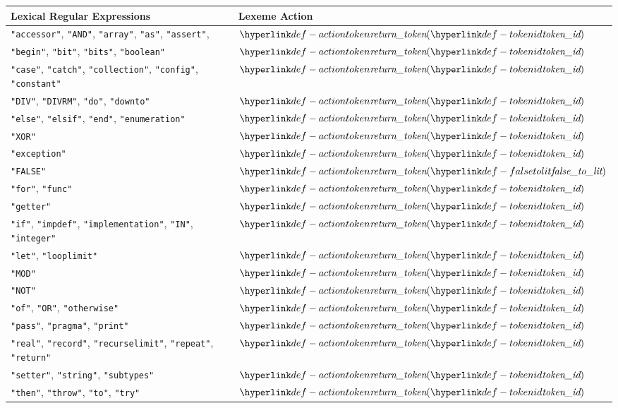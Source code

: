 \begin{center}
\begin{tabular}{ll}
\textbf{Lexical Regular Expressions} & \textbf{Lexeme Action}\\
\hline
\texttt{"accessor"}, \texttt{"AND"}, \texttt{"array"}, \texttt{"as"}, \texttt{"assert"},      & $\actiontoken(\tokenid)$ \\
\texttt{"begin"}, \texttt{"bit"}, \texttt{"bits"}, \texttt{"boolean"}       & $\actiontoken(\tokenid)$ \\
\texttt{"case"}, \texttt{"catch"}, \texttt{"collection"}, \texttt{"config"}, \texttt{"constant"}      & $\actiontoken(\tokenid)$ \\
\texttt{"DIV"}, \texttt{"DIVRM"}, \texttt{"do"}, \texttt{"downto"}        & $\actiontoken(\tokenid)$ \\
\texttt{"else"}, \texttt{"elsif"}, \texttt{"end"}, \texttt{"enumeration"}   & $\actiontoken(\tokenid)$ \\
\texttt{"XOR"}           & $\actiontoken(\tokenid)$ \\
\texttt{"exception"}     & $\actiontoken(\tokenid)$ \\
\texttt{"FALSE"} & $\actiontoken(\falsetolit)$  \\
\texttt{"for"}, \texttt{"func"}          & $\actiontoken(\tokenid)$ \\
\texttt{"getter"}        & $\actiontoken(\tokenid)$ \\
\texttt{"if"}, \texttt{"impdef"}, \texttt{"implementation"}, \texttt{"IN"}, \texttt{"integer"}       & $\actiontoken(\tokenid)$ \\
\texttt{"let"}, \texttt{"looplimit"}           & $\actiontoken(\tokenid)$ \\
\texttt{"MOD"}           & $\actiontoken(\tokenid)$ \\
\texttt{"NOT"}           & $\actiontoken(\tokenid)$ \\
\texttt{"of"},      \texttt{"OR"},      \texttt{"otherwise"}                  & $\actiontoken(\tokenid)$ \\
\texttt{"pass"},    \texttt{"pragma"},  \texttt{"print"}                      & $\actiontoken(\tokenid)$ \\
\texttt{"real"},    \texttt{"record"},  \texttt{"recurselimit"}, \texttt{"repeat"}, \texttt{"return"}  & $\actiontoken(\tokenid)$ \\
\texttt{"setter"},  \texttt{"string"},  \texttt{"subtypes"}                   & $\actiontoken(\tokenid)$ \\
\texttt{"then"},    \texttt{"throw"},   \texttt{"to"}, \texttt{"try"}         & $\actiontoken(\tokenid)$ \\

\end{tabular}
\end{center}
